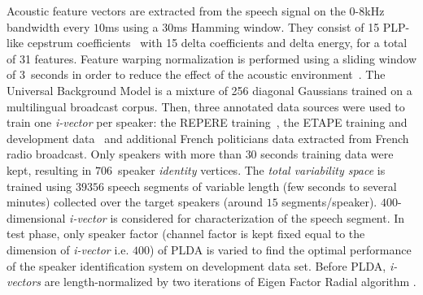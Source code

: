 Acoustic feature vectors are extracted from the speech signal on the 0-8kHz
bandwidth every $10$ms using a $30$ms Hamming window.
They consist of 15 PLP-like cepstrum coefficients~\cite{Hermansky1990}
with 15 delta coefficients and delta energy, for a total of 31 features.
Feature warping normalization is performed using a sliding window of $3$~seconds
in order to reduce the effect of the acoustic environment~\cite{Pelecanos2001}.
The Universal Background Model is a mixture
of 256 diagonal Gaussians trained on a multilingual broadcast corpus.
Then, three annotated data sources were used to train one \emph{i-vector} per speaker: the REPERE training~\cite{Giraudel2012}, the ETAPE training and development data~\cite{Gravier2012} and additional French politicians data extracted from French radio broadcast.
Only speakers with more than $30$ seconds training data were kept,
resulting in $706$~speaker \emph{identity} vertices.
The \emph{total variability space} is trained using $39356$ speech segments
of variable length (few seconds to several minutes) collected
over the target speakers (around $15$ segments/speaker).
$400$-dimensional \emph{i-vector} is considered for characterization of the speech segment.
In test phase, only speaker factor (channel factor is kept fixed equal
to the dimension of \emph{i-vector} i.e. $400$) of PLDA is varied to find
the optimal performance of the speaker identification system
on development data set.
Before PLDA, \emph{i-vectors} are length-normalized by two iterations
of Eigen Factor Radial algorithm \cite{Bousquet2011}.

